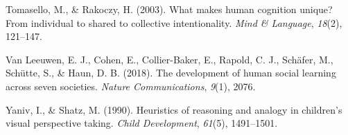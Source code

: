 \documentclass[
  man,floatsintext]{apa7}
\newlength{\cslhangindent}
\newenvironment{CSLReferences}[2] %
 {\begin{list}{}{%
  \setlength{\itemindent}{0pt}
  \setlength{\leftmargin}{0pt}
  \setlength{\parsep}{0pt}
  \ifodd #1
   \setlength{\leftmargin}{\cslhangindent}
   \setlength{\itemindent}{-1\cslhangindent}
  \fi
  \setlength{\itemsep}{#2\baselineskip}}}
 {\end{list}}
\begin{document}
\begin{CSLReferences}{1}{0}
Tomasello, M., \& Rakoczy, H. (2003). What makes human cognition unique? From individual to shared to collective intentionality. \emph{Mind \& Language}, \emph{18}(2), 121--147.

Van Leeuwen, E. J., Cohen, E., Collier-Baker, E., Rapold, C. J., Schäfer, M., Schütte, S., \& Haun, D. B. (2018). The development of human social learning across seven societies. \emph{Nature Communications}, \emph{9}(1), 2076.

Yaniv, I., \& Shatz, M. (1990). Heuristics of reasoning and analogy in children's visual perspective taking. \emph{Child Development}, \emph{61}(5), 1491--1501.

\end{CSLReferences}
\end{document}

